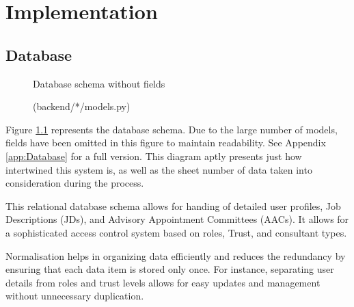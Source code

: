 \chapter{Implementation}
\section{Database} \label{Database}
\begin{figure}[h]
\centering
{}
\vspace{-20pt}
\caption{Database schema without fields}
\vspace{-10pt}
\caption*{(backend/*/models.py)}
\label{fig:database}
\vspace{-5pt}
\end{figure}
Figure \ref{fig:database} represents the database schema. Due to the large number of models, fields have been omitted in this figure to maintain readability. See Appendix \ref{app:Database} for a full version. This diagram aptly presents just how intertwined this system is, as well as the sheet number of data taken into consideration during the process.

This relational database schema allows for handing of detailed user profiles, Job Descriptions (JDs), and Advisory Appointment Committees (AACs). It allows for a sophisticated access control system based on roles, Trust, and consultant types. 

Normalisation helps in organizing data efficiently and reduces the redundancy by ensuring that each data item is stored only once. For instance, separating user details from roles and trust levels allows for easy updates and management without unnecessary duplication. 


